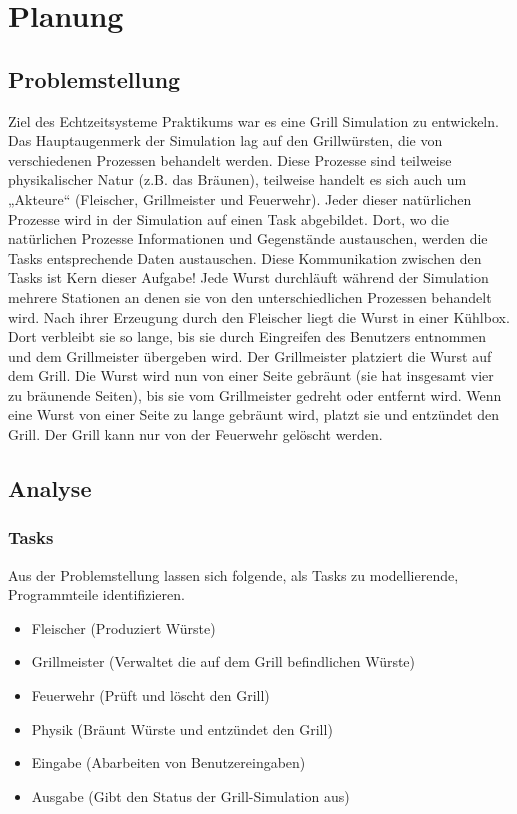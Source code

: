 \chapter{Planung}

\section{Problemstellung}

Ziel des Echtzeitsysteme Praktikums war es eine Grill Simulation
zu entwickeln. Das Hauptaugenmerk der Simulation lag auf den Grillwürsten, die von
verschiedenen Prozessen behandelt werden. Diese Prozesse sind teilweise
physikalischer Natur (z.B. das Bräunen), teilweise handelt es sich auch um „Akteure“
(Fleischer, Grillmeister und Feuerwehr). Jeder dieser natürlichen Prozesse wird in der
Simulation auf einen Task abgebildet. Dort, wo die natürlichen Prozesse Informationen
und Gegenstände austauschen, werden die Tasks entsprechende Daten austauschen.
Diese Kommunikation zwischen den Tasks ist Kern dieser Aufgabe!
Jede Wurst durchläuft während der Simulation mehrere Stationen an denen sie von
den unterschiedlichen Prozessen behandelt wird. Nach ihrer Erzeugung durch den
Fleischer liegt die Wurst in einer Kühlbox. Dort verbleibt sie so lange, bis sie durch
Eingreifen des Benutzers entnommen und dem Grillmeister übergeben wird. Der
Grillmeister platziert die Wurst auf dem Grill. Die Wurst wird nun von einer Seite
gebräunt (sie hat insgesamt vier zu bräunende Seiten), bis sie vom Grillmeister
gedreht oder entfernt wird. Wenn eine Wurst von einer Seite zu lange gebräunt wird,
platzt sie und entzündet den Grill. Der Grill kann nur von der Feuerwehr gelöscht
werden.

\section{Analyse}

\subsection{Tasks}

Aus der Problemstellung lassen sich folgende, als Tasks zu modellierende, Programmteile identifizieren.

\begin{itemize}
\item Fleischer (Produziert Würste)
\item Grillmeister (Verwaltet die auf dem Grill befindlichen Würste)
\item Feuerwehr (Prüft und löscht den Grill)
\item Physik (Bräunt Würste und entzündet den Grill)
\item Eingabe (Abarbeiten von Benutzereingaben)
\item Ausgabe (Gibt den Status der Grill-Simulation aus)
\end{itemize}

